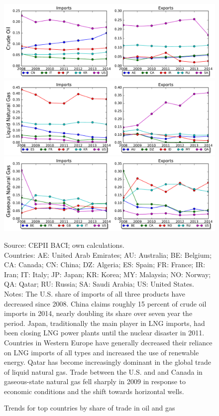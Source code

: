 \documentclass[10pt,letterpaper,pdftex]{article}
\begin{document}
\begin{figure}[!htb]
  \caption{Trends for top countries by share of trade in oil and gas}
  {\centering
\includegraphics[scale=0.59]{plots/270900.pdf} \\
\includegraphics[scale=0.59]{plots/271111.pdf} \\
\includegraphics[scale=0.59]{plots/271121.pdf} \\ \par
} 
\footnotesize{Source: CEPII BACI; own calculations. \\
Countries: AE: United Arab Emirates; AU: Australia; BE: Belgium; CA: Canada; CN: China; DZ: Algeria; ES: Spain; FR: France; IR: Iran; IT: Italy; JP: Japan; KR: Korea; MY: Malaysia; NO: Norway; QA: Qatar; RU: Russia; SA: Saudi Arabia; US: United States.\\ 
Notes: The U.S. share of imports of all three products have decreased since 2008. China claims roughly 15 percent of crude oil imports in 2014, nearly doubling its share over seven year the period. Japan, traditionally the main player in LNG imports, had been closing LNG power plants until the nuclear disaster in 2011. Countries in Western Europe have generally decreased their reliance on LNG imports of all types and increased the use of renewable energy. Qatar has become increasingly dominant in the global trade of liquid natural gas. Trade between the U.S. and and Canada in gaseous-state natural gas fell sharply in 2009 in response to economic conditions and the shift towards horizontal wells. }
\end{figure}
\end{document}
